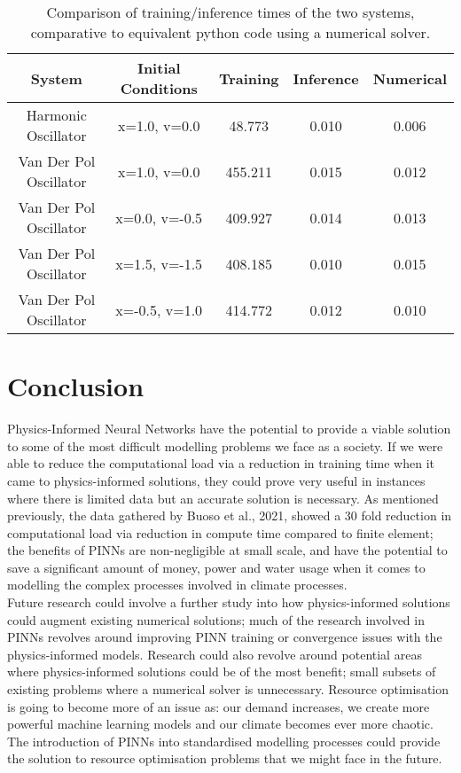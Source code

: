 \documentclass[12pt, openany]{book}
\begin{document}
\begin{table}[h!]
\centering
\begin{tabular}{||c c c c c|} 
 \hline
  System & Initial Conditions & Training & Inference & Numerical \\ [0.5ex] 
 \hline\hline
 Harmonic Oscillator & x=1.0, v=0.0 & 48.773 & 0.010 & 0.006 \\
 Van Der Pol Oscillator & x=1.0, v=0.0 & 455.211 & 0.015 & 0.012 \\ 
 Van Der Pol Oscillator & x=0.0, v=-0.5 & 409.927 & 0.014 & 0.013 \\ 
 Van Der Pol Oscillator & x=1.5, v=-1.5 & 408.185 & 0.010 & 0.015 \\ 
 Van Der Pol Oscillator & x=-0.5, v=1.0 & 414.772 & 0.012 & 0.010 \\ [1ex] 
 \hline
\end{tabular}
\caption{Comparison of training/inference times of the two systems, comparative to equivalent python code using a numerical solver.}
\label{table:1}
\end{table}

\section{Conclusion}

Physics-Informed Neural Networks have the potential to provide a viable solution to some of the most difficult modelling problems we face as a society. If we were able to reduce the computational load via a reduction in training time when it came to physics-informed solutions, they could prove very useful in instances where there is limited data but an accurate solution is necessary. As mentioned previously, the data gathered by Buoso et al., 2021, showed a 30 fold reduction in computational load via reduction in compute time compared to finite element; the benefits of PINNs are non-negligible at small scale, and have the potential to save a significant amount of money, power and water usage when it comes to modelling the complex processes involved in climate processes. \\

Future research could involve a further study into how physics-informed solutions could augment existing numerical solutions; much of the research involved in PINNs revolves around improving PINN training or convergence issues with the physics-informed models. Research could also revolve around potential areas where physics-informed solutions could be of the most benefit; small subsets of existing problems where a numerical solver is unnecessary. Resource optimisation is going to become more of an issue as: our demand increases, we create more powerful machine learning models and our climate becomes ever more chaotic. The introduction of PINNs into standardised modelling processes could provide the solution to resource optimisation problems that we might face in the future.
\end{document}
